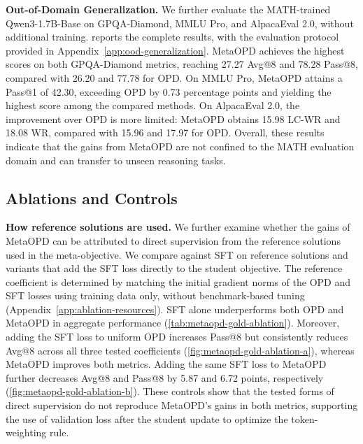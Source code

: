 \documentclass{article}
\theoremstyle{plain}
\theoremstyle{definition}
\theoremstyle{remark}
\begin{document}
\textbf{Out-of-Domain Generalization.}
We further evaluate the MATH-trained Qwen3-1.7B-Base on GPQA-Diamond, MMLU Pro, and AlpacaEval 2.0, without additional training.  reports the complete results, with the evaluation protocol provided in Appendix~\ref{app:ood-generalization}. MetaOPD achieves the highest scores on both GPQA-Diamond metrics, reaching 27.27 Avg@8 and 78.28 Pass@8, compared with 26.20 and 77.78 for OPD. On MMLU Pro, MetaOPD attains a Pass@1 of 42.30, exceeding OPD by 0.73 percentage points and yielding the highest score among the compared methods. On AlpacaEval 2.0, the improvement over OPD is more limited: MetaOPD obtains 15.98 LC-WR and 18.08 WR, compared with 15.96 and 17.97 for OPD. Overall, these results indicate that the gains from MetaOPD are not confined to the MATH evaluation domain and can transfer to unseen reasoning tasks.
















\subsection{Ablations and Controls}
\label{sec:ablations}








\textbf{How reference solutions are used.}
We further examine whether the gains of MetaOPD can be attributed to direct supervision from the reference solutions used in the meta-objective. We compare against SFT on reference solutions and variants that add the SFT loss directly to the student objective. The reference coefficient is determined by matching the initial gradient norms of the OPD and SFT losses using training data only, without benchmark-based tuning (Appendix~\ref{app:ablation-resources}). SFT alone underperforms both OPD and MetaOPD in aggregate performance (\cref{tab:metaopd-gold-ablation}). Moreover, adding the SFT loss to uniform OPD increases Pass@8 but consistently reduces Avg@8 across all three tested coefficients (\cref{fig:metaopd-gold-ablation-a}), whereas MetaOPD improves both metrics. Adding the same SFT loss to MetaOPD further decreases Avg@8 and Pass@8 by 5.87 and 6.72 points, respectively (\cref{fig:metaopd-gold-ablation-b}). These controls show that the tested forms of direct supervision do not reproduce MetaOPD's gains in both metrics, supporting the use of validation loss after the student update to optimize the token-weighting rule.
\end{document}
